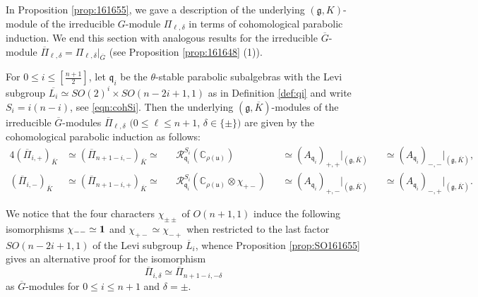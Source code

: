 In Proposition \ref{prop:161655}, 
 we gave a description of the underlying $({\mathfrak{g}},{K})$-module
 of the irreducible $G$-module $\Pi_{\ell,\delta}$ 
 in terms of cohomological parabolic induction.  
We end this section 
 with analogous results
for the irreducible $\overline G$-module 
 $\overline \Pi_{\ell,\delta}= \Pi_{\ell,\delta}|_{\overline G}$
 (see Proposition \ref{prop:161648} (1)).  
\begin{proposition}
\label{prop:SO161655}
For $0 \le i \le [\frac {n+1}2]$, 
 let 
${\mathfrak{q}}_i$ be the $\theta$-stable parabolic subalgebras
 with the Levi subgroup $\overline{L_i} \simeq SO(2)^i \times SO(n-2i+1,1)$
 as in Definition \ref{def:qi}
 and write $S_i=i(n-i)$, 
 see \eqref{eqn:cohSi}.  
Then the underlying $({\mathfrak {g}},\overline{K})$-modules
 of the irreducible $\overline G$-modules $\overline{\Pi}_{\ell, \delta}$
 $(0 \le \ell \le n+1$, $\delta \in \{\pm\})$
 are given by the cohomological parabolic induction
 as follows:
\begin{alignat*}{4}
  (\overline{\Pi}_{i,+})_{\overline K} 
&\simeq
 (\overline{\Pi}_{n+1-i,-})_{\overline K}
 \simeq
&& {\mathcal{R}}_{\mathfrak {q}_i}^{S_i}({\mathbb{C}}_{\rho({\mathfrak{u}})})
&& \simeq (A_{\mathfrak{q}_i})_{+,+}|_{({\mathfrak {g}},\overline{K})} 
&&  \simeq (A_{\mathfrak{q}_i})_{-,-}|_{({\mathfrak {g}},\overline{K})}, 
\\
   (\overline{\Pi}_{i,-})_{\overline K} 
&\simeq 
 (\overline {\Pi}_{n+1-i,+})_{\overline K}
   \simeq 
   && {\mathcal{R}}_{\mathfrak {q}_i}^{S_i}({\mathbb{C}}_{\rho({\mathfrak{u}})} \otimes \chi_{+-})
&& \simeq (A_{\mathfrak{q}_i})_{+,-}|_{({\mathfrak {g}},\overline{K})} 
&&\simeq (A_{\mathfrak{q}_i})_{-,+}|_{({\mathfrak {g}},\overline{K})}.  
\end{alignat*}
\end{proposition}
We notice that the four characters $\chi_{\pm \pm}$
 of $O(n+1,1)$ induce the following isomorphisms $\chi_{--} \simeq {\bf{1}}$
 and $\chi_{+-} \simeq \chi_{-+}$
 when restricted to the last factor
 $SO(n-2i+1,1)$ of the Levi subgroup $\overline{L}_i$, 
 whence Proposition \ref{prop:SO161655} gives an alternative proof
 for the isomorphism
\[
  \overline{\Pi}_{i,\delta} \simeq \overline{\Pi}_{n+1-i,-\delta}
\]
 as $\overline G$-modules
 for $0 \le i \le n+1$ and $\delta = \pm$.  



